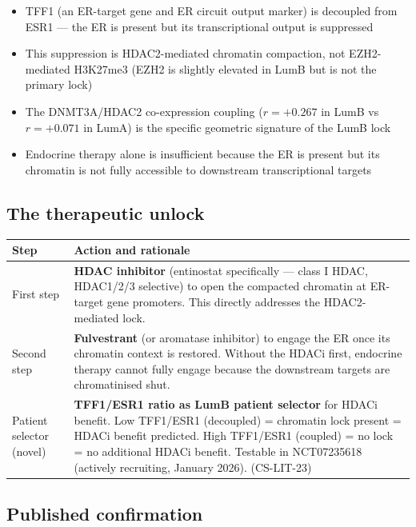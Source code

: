\documentclass[12pt, a4paper]{article}
\begin{document}
\begin{itemize}[noitemsep]
  \item TFF1 (an ER-target gene and ER circuit
        output marker) is decoupled from ESR1 ---
        the ER is present but its transcriptional
        output is suppressed
  \item This suppression is HDAC2-mediated chromatin
        compaction, not EZH2-mediated H3K27me3
        (EZH2 is slightly elevated in LumB but is
        not the primary lock)
  \item The DNMT3A/HDAC2 co-expression coupling
        ($r=+0.267$ in LumB vs $r=+0.071$ in LumA)
        is the specific geometric signature of
        the LumB lock
  \item Endocrine therapy alone is insufficient
        because the ER is present but its chromatin
        is not fully accessible to downstream
        transcriptional targets
\end{itemize}

\subsection{The therapeutic unlock}

\begin{center}
\begin{tabular}{p{3.5cm}p{9cm}}
\toprule
\textbf{Step} & \textbf{Action and rationale} \\
\midrule
First step
& \textbf{HDAC inhibitor} (entinostat specifically ---
  class I HDAC, HDAC1/2/3 selective) to open the
  compacted chromatin at ER-target gene promoters.
  This directly addresses the HDAC2-mediated lock. \\[0.3em]
Second step
& \textbf{Fulvestrant} (or aromatase inhibitor) to
  engage the ER once its chromatin context is restored.
  Without the HDACi first, endocrine therapy cannot
  fully engage because the downstream targets are
  chromatinised shut. \\[0.3em]
Patient selector (novel)
& \textbf{TFF1/ESR1 ratio as LumB patient selector}
  for HDACi benefit. Low TFF1/ESR1 (decoupled)
  = chromatin lock present = HDACi benefit predicted.
  High TFF1/ESR1 (coupled) = no lock = no additional
  HDACi benefit. Testable in NCT07235618 (actively
  recruiting, January 2026). (CS-LIT-23) \\
\bottomrule
\end{tabular}
\end{center}

\subsection{Published confirmation}
\end{document}
